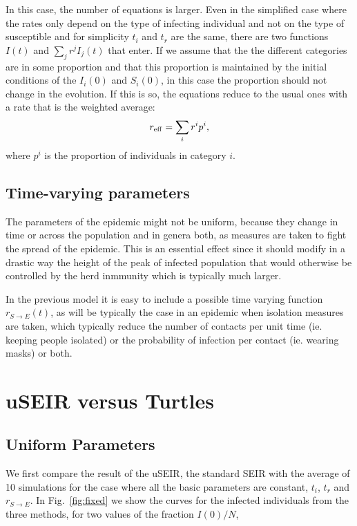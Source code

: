 \documentclass[a4paper,oneside,11pt]{article}
\begin{document}
 In this case, the number of equations is larger. Even in the simplified case where the rates only depend on the type of infecting individual and not on the type of susceptible and for simplicity $t_i$ and $t_r$ are the same, there are two functions $I(t)$ and $\sum_j r^j I_j(t)$ that enter. If we assume that the the different categories are in some proportion and that this proportion is maintained by the initial conditions of the $I_i(0)$ and $S_i(0)$, in this case the proportion should not change in the evolution. If this is so, the equations reduce to the usual ones with a rate that is the weighted average:
 \begin{eqnarray}
 r_{\rm eff} = \sum_i r^i p^i,
 \end{eqnarray}
 where $p^i$ is the proportion of individuals in category $i$.
 
 \subsection{Time-varying parameters}
 
 The parameters of the epidemic might not be uniform, because they change in time or across the population and in genera both, as measures are taken to 
 fight the spread of the epidemic. This is an essential effect since it should modify in a drastic way the height of the peak of infected population that would otherwise
 be controlled by the herd inmmunity which is typically much larger. 

In the previous model it is easy to include a possible time varying function $r_{S\rightarrow E}(t)$, as will be typically the case in an epidemic when isolation measures are taken, which typically reduce the number of contacts per unit time (ie. keeping people isolated) or the probability of infection per contact (ie. wearing masks) or both. 




\section{uSEIR versus Turtles}

\subsection{Uniform Parameters}

We first compare the result of the uSEIR, the standard SEIR with the average of 10 simulations for the case where all the basic parameters are constant, $t_i$, $t_r$ and $r_{S\rightarrow E}$. 
In Fig.~\ref{fig:fixed} we show the curves for the infected individuals from the three methods, for two values of the fraction $I(0)/N$, 
\end{document}
